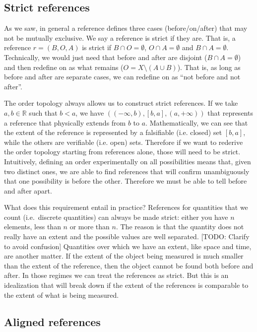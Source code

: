 \documentclass[12pt]{iopart}
\begin{document}
\subsection{Strict references}

As we saw, in general a reference defines three cases (before/on/after) that may not be mutually exclusive. We say a reference is strict if they are. That is, a reference $r= (B, O, A)$ is strict if $B \cap O = \emptyset$, $O \cap A = \emptyset$ and $B \cap A = \emptyset$. Technically, we would just need that before and after are disjoint ($B \cap A = \emptyset$) and then redefine on as what remains ($O = X \setminus (A \cup B)$). That is, as long as before and after are separate cases, we can redefine on as ``not before and not after''.

The order topology always allows us to construct strict references. If we take $a,b \in \mathbb{R}$ such that $b<a$, we have $( (-\infty, b), [b, a], (a, +\infty) )$ that represents a reference that physically extends from $b$ to $a$. Mathematically, we can see that the extent of the reference is represented by a falsifiable (i.e. closed) set $[b,a]$, while the others are verifiable (i.e. open) sets. Therefore if we want to rederive the order topology starting from references alone, those will need to be strict. Intuitively, defining an order experimentally on all possibilities means that, given two distinct ones, we are able to find references that will confirm unambiguously that one possibility is before the other. Therefore we must be able to tell before and after apart.

What does this requirement entail in practice? References for quantities that we count (i.e.~discrete quantities) can always be made strict: either you have $n$ elements, less than $n$ or more than $n$. The reason is that the quantity does not really have an extent and the possible values are well separated. [TODO: Clarify to avoid confusion] Quantities over which we have an extent, like space and time, are another matter. If the extent of the object being measured is much smaller than the extent of the reference, then the object cannot be found both before and after. In those regimes we can treat the references as strict. But this is an idealization that will break down if the extent of the references is comparable to the extent of what is being measured.

\subsection{Aligned references}
\end{document}
